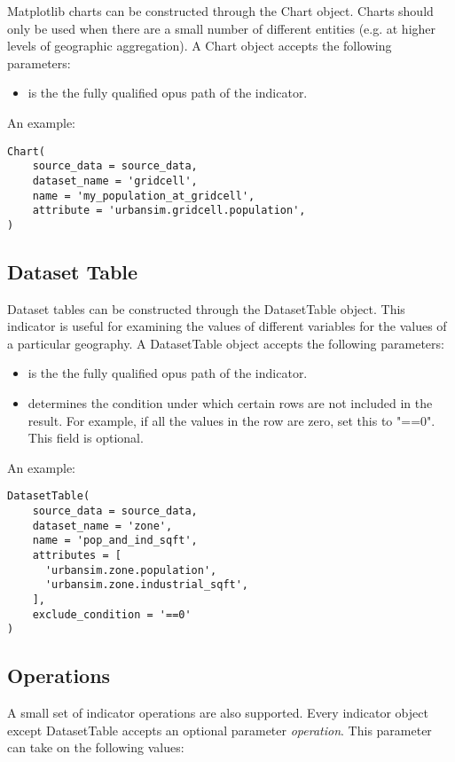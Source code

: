 Matplotlib charts can be constructed through the Chart object. 
Charts should only be used when there are a small number of different 
entities (e.g. at higher levels of geographic aggregation).
A Chart object accepts the following parameters:

\begin{itemize}
\tight
\item {} is the the fully qualified opus path of the indicator. 
\end{itemize}

An example:
\begin{verbatim}
Chart(
    source_data = source_data,
    dataset_name = 'gridcell',
    name = 'my_population_at_gridcell',
    attribute = 'urbansim.gridcell.population',
)
\end{verbatim}

\subsection{Dataset Table}
Dataset tables can be constructed through the DatasetTable object. 
This indicator is useful for examining the values of different 
variables for the values of a particular geography. 
A DatasetTable object accepts the following parameters:

\begin{itemize}
\tight
\item {} is the the fully qualified opus path of the indicator.
\item {} determines the condition under which certain rows 
are not included in the result. For example, if all the values in the row 
are zero, set this to "==0". This field is optional.
\end{itemize}

An example:
\begin{verbatim}
DatasetTable(
    source_data = source_data,
    dataset_name = 'zone',
    name = 'pop_and_ind_sqft',
    attributes = [ 
      'urbansim.zone.population',
      'urbansim.zone.industrial_sqft',                     
    ],
    exclude_condition = '==0' 
)
\end{verbatim}

\subsection{Operations}

A small set of indicator operations are also supported. 
Every indicator object except DatasetTable 
accepts an optional parameter \emph{operation}. This parameter can take on the
following values:

